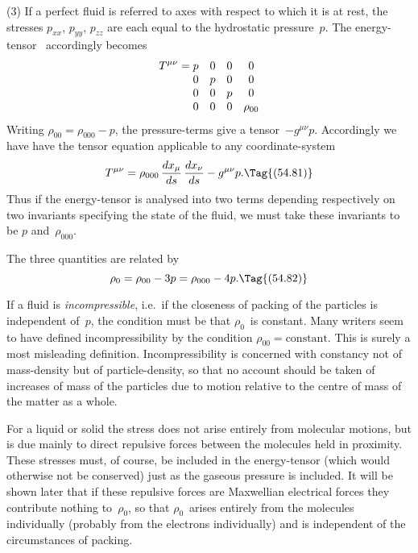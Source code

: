 \documentclass[12pt]{book}
\begin{document}
(3) If a perfect fluid is referred to axes with respect to which it is at rest,
the stresses $p_{xx}$, $p_{yy}$, $p_{zz}$ are each equal to the hydrostatic pressure~$p$. The
%
%
energy-tensor~ accordingly becomes
\[
T^{\mu\nu} = \begin{array}[t]{@{}c@{\quad}c@{\quad}c@{\quad}c@{}}
  p & 0 & 0 & 0\\
  0 & p & 0 & 0\\
  0 & 0 & p & 0\\
  0 & 0 & 0 & \rho_{00}\\
\end{array}
\]
Writing $\rho_{00} = \rho_{000} - p$, the pressure-terms give a tensor~$-g^{\mu\nu} p$. Accordingly
we have have the tensor equation applicable to any coordinate-system
\[
T^{\mu\nu} = \rho_{000}\, \frac{dx_{\mu}}{ds}\, \frac{dx_{\nu}}{ds} - g^{\mu\nu} p.
\Tag{(54.81)}
\]
Thus if the energy-tensor is analysed into two terms depending respectively
on two invariants specifying the state of the fluid, we must take these invariants
to be $p$ and~$\rho_{000}$.

The three quantities are related by
\[
\rho_{0} = \rho_{00} - 3p = \rho_{000} - 4p.
\Tag{(54.82)}
\]

If a fluid is \emph{incompressible}, i.e.\ if the closeness of packing of the particles
is independent of~$p$, the condition must be that $\rho_{0}$~is constant\footnotemark.\footnotetext
  {Many writers seem to have defined incompressibility by the condition $\rho_{00} = \text{constant}$. This
%
  is surely a most misleading definition.}
Incompressibility
is concerned with constancy not of mass-density but of particle-density,
so that no account should be taken of increases of mass of the particles due
to motion relative to the centre of mass of the matter as a whole.

For a liquid or solid the stress does not arise entirely from molecular
motions, but is due mainly to direct repulsive forces between the molecules held
in proximity. These stresses must, of course, be included in the energy-tensor
(which would otherwise not be conserved) just as the gaseous pressure is
included. It will be shown later that if these repulsive forces are Maxwellian
electrical forces they contribute nothing to~$\rho_{0}$, so that $\rho_{0}$~arises entirely from
the molecules individually (probably from the electrons individually) and is
independent of the circumstances of packing.
\end{document}
